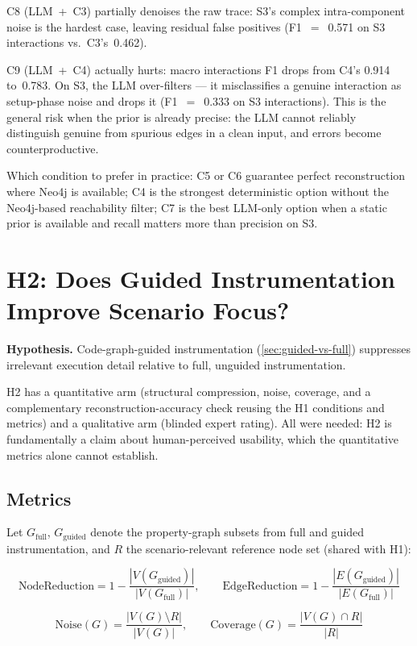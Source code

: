 C8 (LLM~+~C3) partially denoises the raw trace: S3's complex
intra-component noise is the hardest case, leaving residual false
positives (F1~$=$~0.571 on S3 interactions vs.\ C3's~0.462).

C9 (LLM~+~C4) actually hurts: macro interactions F1 drops from C4's
0.914 to~0.783. On S3, the \ac{LLM} over-filters --- it misclassifies a
genuine interaction as setup-phase noise and drops it
(F1~$=$~0.333 on S3 interactions). This is the general risk when the
prior is already precise: the \ac{LLM} cannot reliably distinguish
genuine from spurious edges in a clean input, and errors become
counterproductive.

Which condition to prefer in practice: C5 or C6 guarantee perfect
reconstruction where Neo4j is available; C4 is the strongest deterministic option without the Neo4j-based reachability filter; C7 is the best LLM-only option when a static prior
is available and recall matters more than precision on S3.

\section{H2: Does Guided Instrumentation Improve Scenario Focus?}\label{sec:h2}

\textbf{Hypothesis.} Code-graph-guided instrumentation
(\cref{sec:guided-vs-full}) suppresses irrelevant execution detail
relative to full, unguided instrumentation.

H2 has a quantitative arm (structural compression, noise, coverage, and
a complementary reconstruction-accuracy check reusing the H1 conditions
and metrics) and a qualitative arm (blinded expert rating). All were
needed: H2 is fundamentally a claim about human-perceived usability,
which the quantitative metrics alone cannot establish.

\subsection{Metrics}

Let $G_{\text{full}}$, $G_{\text{guided}}$ denote the property-graph
subsets from full and guided instrumentation, and $R$ the
scenario-relevant reference node set (shared with H1):

\[
  \text{NodeReduction} = 1 - \frac{|V(G_{\text{guided}})|}{|V(G_{\text{full}})|},
  \qquad
  \text{EdgeReduction} = 1 - \frac{|E(G_{\text{guided}})|}{|E(G_{\text{full}})|}
\]

\[
  \text{Noise}(G) = \frac{|V(G) \setminus R|}{|V(G)|},
  \qquad
  \text{Coverage}(G) = \frac{|V(G) \cap R|}{|R|}
\]

